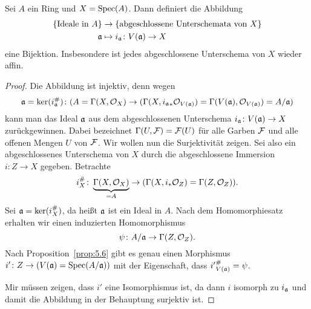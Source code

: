\begin{thm}
\label{thm:7.5}
	Sei $A$ ein Ring und $X=\operatorname{Spec}(A)$. Dann definiert die Abbildung
	\begin{align*}
		\{\text{Ideale in }A\}&\to \{\text{abgeschlossene Unterschemata von }X\}\\
		\mathfrak{a} &\mapsto i_{\mathfrak{a}}\colon V(\mathfrak{a}) \to X
	\end{align*}
	eine Bijektion. Insbesondere ist jedes abgeschlossene Unterschema von $X$ wieder affin.
	\begin{proof}
		Die Abbildung ist injektiv, denn wegen
		\[
			\mathfrak{a} = \ker(i^{\#}_{\mathfrak{a}})\colon (A = \Gamma(X,\mathcal{O}_X) \to (\Gamma(X,{i_{\mathfrak{a}}}_*\mathcal{O}_{V(\mathfrak{a})}) = \Gamma(V(\mathfrak{a}),\mathcal{O}_{V(\mathfrak{a})}) = A/\mathfrak{a})
		\]
		kann man das Ideal $\mathfrak{a}$ aus dem abgeschlossenen Unterschema $i_{\mathfrak{a}} \colon V(\mathfrak{a}) \to X$ zurückgewinnen. Dabei bezeichnet $\Gamma(U,\mathcal{F}) = \mathcal{F}(U)$ für alle Garben $\mathcal{F}$ und alle offenen Mengen $U$ von $\mathcal{F}$. Wir wollen nun die Surjektivität zeigen. Sei also ein abgeschlossenes Unterschema von $X$ durch die abgeschlossene Immersion $i \colon Z \to X$ gegeben. Betrachte
		\[
			i_X^{\#}\colon \underbrace{\Gamma(X,\mathcal{O}_X)}_{=A} \to (\Gamma(X,i_*\mathcal{O}_Z) = \Gamma(Z,\mathcal{O}_Z)).
		\]
		Sei $\mathfrak{a} = \ker(i_X^{\#})$, da heißt $\mathfrak{a}$ ist ein Ideal in $A$. Nach dem Homomorphiesatz erhalten wir einen induzierten Homomorphismus
		\[
			\psi \colon A/\mathfrak{a} \to \Gamma(Z,\mathcal{O}_Z).
		\]
		Nach Proposition~\ref{prop:5.6} gibt es genau einen Morphismus $i'\colon Z \to (V(\mathfrak{a}) = \operatorname{Spec}(A/\mathfrak{a}))$ mit der Eigenschaft, dass ${i'}^{\#}_{V(\mathfrak{a})} = \psi$.
		\begin{center}
		\end{center}
		Mir müssen zeigen, dass $i'$ eine Isomorphismus ist, da dann $i$ isomorph zu $i_{\mathfrak{a}}$ und damit die Abbildung in der Behauptung surjektiv ist.


\end{proof}
\end{thm}
